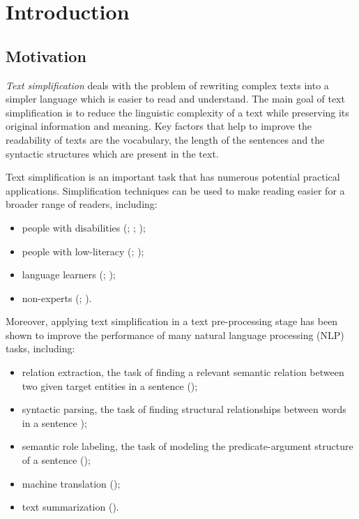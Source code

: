 
\chapter{Introduction}

\section{Motivation}

\emph{Text simplification} deals with the problem of rewriting complex texts into a simpler language which is easier to read and understand. The main goal of text simplification is to reduce the linguistic complexity of a text while preserving its original information and meaning. Key factors that help to improve the readability of texts are the vocabulary, the length of the sentences and the syntactic structures which are present in the text. 

Text simplification is an important task that has numerous potential practical applications. Simplification techniques can be used to make reading easier for a broader range of readers, including:

\begin{itemize}
    \item people with disabilities (\cite{Canning:2000:CGS:647238.720905}; \cite{carroll-etal-1999-simplifying}; \cite{Inui:2003:TSR:1118984.1118986});
    \item people with low-literacy (\cite{de-belder-text-simplification-for-children}; \cite{Watanabe:2009:FRA:1621995.1622002});
    \item language learners (\cite{allen-role-of-relative-clauses}; \cite{Petersen2007TextSF});
    \item non-experts (\cite{Elhadad:2007:MLT:1572392.1572402}; \cite{Siddharthan:2010:RDC:1857999.1858142}).
\end{itemize}


Moreover, applying text simplification in a text pre-processing stage has been shown to improve the performance of many natural language processing (NLP) tasks, including:

\begin{itemize}
    \item relation extraction, the task of finding a relevant semantic relation between two given target entities in a sentence (\cite{Miwa:2010:ESS:1873781.1873870});
    \item syntactic parsing, the task of finding structural relationships between words in a sentence \cite{jonnalagadda-etal-2009-towards});
    \item semantic role labeling, the task of modeling the predicate-argument structure of a sentence (\cite{vickrey-koller-2008-sentence});
    \item machine translation (\cite{stajner-popovic-2016-text});
    \item text summarization (\cite{margarido}).
\end{itemize}

